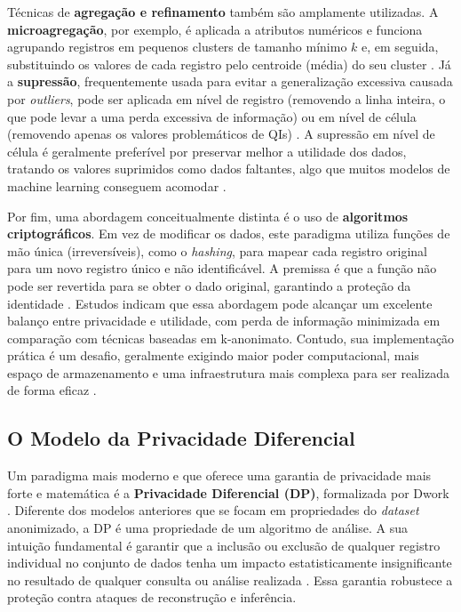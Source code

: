 Técnicas de \textbf{agregação e refinamento} também são amplamente utilizadas. A \textbf{microagregação}, por exemplo, é aplicada a atributos numéricos e funciona agrupando registros em pequenos clusters de tamanho mínimo $k$ e, em seguida, substituindo os valores de cada registro pelo centroide (média) do seu cluster \cite{Olatunji2024}. Já a \textbf{supressão}, frequentemente usada para evitar a generalização excessiva causada por \textit{outliers}, pode ser aplicada em nível de registro (removendo a linha inteira, o que pode levar a uma perda excessiva de informação) ou em nível de célula (removendo apenas os valores problemáticos de QIs) \cite{Olatunji2024}. A supressão em nível de célula é geralmente preferível por preservar melhor a utilidade dos dados, tratando os valores suprimidos como dados faltantes, algo que muitos modelos de machine learning conseguem acomodar \cite{Olatunji2024}.

Por fim, uma abordagem conceitualmente distinta é o uso de \textbf{algoritmos criptográficos}. Em vez de modificar os dados, este paradigma utiliza funções de mão única (irreversíveis), como o \textit{hashing}, para mapear cada registro original para um novo registro único e não identificável. A premissa é que a função não pode ser revertida para se obter o dado original, garantindo a proteção da identidade \cite{Vovk2023}. Estudos indicam que essa abordagem pode alcançar um excelente balanço entre privacidade e utilidade, com perda de informação minimizada em comparação com técnicas baseadas em k-anonimato. Contudo, sua implementação prática é um desafio, geralmente exigindo maior poder computacional, mais espaço de armazenamento e uma infraestrutura mais complexa para ser realizada de forma eficaz \cite{Vovk2023}.

\subsection{O Modelo da Privacidade Diferencial}
\label{subsec:fund-privacidade-diferencial}

Um paradigma mais moderno e que oferece uma garantia de privacidade mais forte e matemática é a \textbf{Privacidade Diferencial (DP)}, formalizada por Dwork \cite{Dwork2006}. Diferente dos modelos anteriores que se focam em propriedades do \textit{dataset} anonimizado, a DP é uma propriedade de um algoritmo de análise. A sua intuição fundamental é garantir que a inclusão ou exclusão de qualquer registro individual no conjunto de dados tenha um impacto estatisticamente insignificante no resultado de qualquer consulta ou análise realizada \cite{Olatunji2024}. Essa garantia robustece a proteção contra ataques de reconstrução e inferência.


